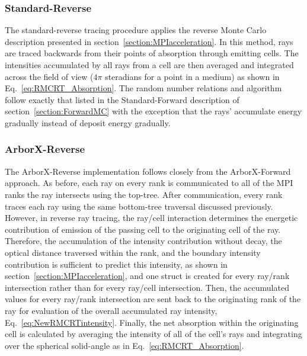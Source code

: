 \subsubsection{Standard-Reverse}
The standard-reverse tracing procedure applies the reverse Monte Carlo description presented in section~\ref{section:MPIacceleration}. In this method, rays are traced backwards from their points of absorption through emitting cells. The intensities accumulated by all rays from a cell are then averaged and integrated across the field of view ($4\pi$ steradians for a point in a medium) as shown in Eq.~\ref{eq:RMCRT_Absorption}. The random number relations and algorithm follow exactly that listed in the Standard-Forward description of section~\ref{section:ForwardMC} with the exception that the rays' accumulate energy gradually instead of deposit energy gradually.

\subsubsection{ArborX-Reverse}
The ArborX-Reverse implementation follows closely from the ArborX-Forward approach. As before, each ray on every rank is communicated to all of the MPI ranks the ray intersects using the top-tree. After communication, every rank traces each ray using the same bottom-tree traversal discussed previously.
However, in reverse ray tracing, the ray/cell interaction determines the energetic contribution of emission of the passing cell to the originating cell of the ray. Therefore, the accumulation of the intensity contribution without decay, the optical distance traversed within the rank, and the boundary intensity contribution is sufficient to predict this intensity, as shown in section~\ref{section:MPIacceleration}, and one struct is created for every ray/rank intersection rather than for every ray/cell intersection. Then, the accumulated values for every ray/rank intersection are sent back to the originating rank of the ray for evaluation of the overall accumulated ray intensity, Eq.~\ref{eq:NewRMCRTintensity}.
Finally, the net absorption within the originating cell is calculated by averaging the intensity of all of the cell's rays and integrating over the spherical solid-angle as in Eq.~\ref{eq:RMCRT_Absorption}.

